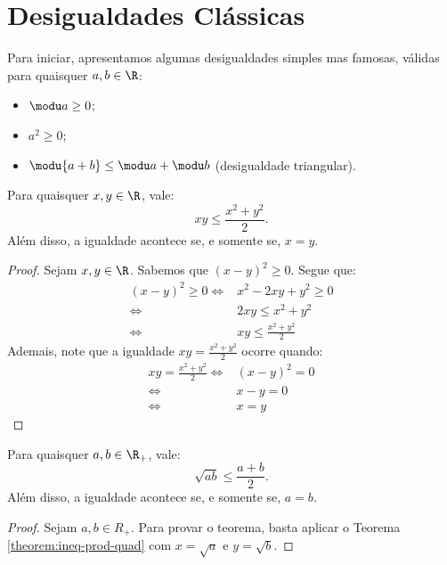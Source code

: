 \section{Desigualdades Clássicas}

Para iniciar, apresentamos algumas desigualdades simples mas famosas, válidas para quaisquer $a,b \in \R$:
\begin{itemize}
  \item $\modu a \ge 0$;
  \item $a^2 \ge 0$;
  \item $\modu {a+b} \le \modu a + \modu b$ (desigualdade triangular).
\end{itemize}

\begin{theorem}
\label{theorem:ineq-prod-quad}
Para quaisquer $x, y \in \R$, vale:
%
\begin{equation*}
    xy \le \frac {x^2 +y^2} 2.
\end{equation*}
%
Além disso, a igualdade acontece se, e somente se, $x=y$.
\end{theorem}

\begin{proof}
Sejam $x, y \in \R$. Sabemos que $(x-y)^2 \ge 0$. Segue que:
%
\begin{align*}
	(x-y)^2 \ge 0 \iff & x^2 - 2xy + y^2 \ge 0 \\
				  \iff & 2xy \le x^2 + y^2 \\
				  \iff & xy \le \frac {x^2 + y^2} 2
\end{align*}
%
Ademais, note que a igualdade $xy = \frac {x^2 + y^2} 2$ ocorre quando:
%
\begin{align*}
	xy = \frac {x^2 + y^2} 2 \iff & (x-y)^2 = 0 \\
							 \iff & x-y = 0 \\
							 \iff & x = y
\end{align*}
\end{proof}

\begin{theorem}
\label{theo:desigualdade-medias-dois-termos}
Para quaisquer $a, b \in \R_+$, vale:
%
\begin{equation*}
    \sqrt{ab} \leq \frac {a +b} 2.
\end{equation*}
Além disso, a igualdade acontece se, e somente se, $a=b$.
\end{theorem}

\begin{proof}
Sejam $a, b \in R_+$. Para provar o teorema, basta aplicar o Teorema \ref{theorem:ineq-prod-quad} com $x = \sqrt a$ e $y = \sqrt b$.
\end{proof}

